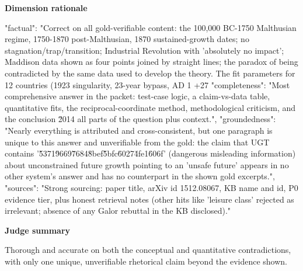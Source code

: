 \documentclass[10pt]{article}
\begin{document}
\textbf{Dimension rationale}
\begin{EvidenceText}
{
  "factual": "Correct on all gold-verifiable content: the 100,000 BC-1750 Malthusian regime, 1750-1870 post-Malthusian, 1870 sustained-growth dates; no stagnation/trap/transition; Industrial Revolution with 'absolutely no impact'; Maddison data shown as four points joined by straight lines; the paradox of being contradicted by the same data used to develop the theory. The fit parameters for 12 countries (1923 singularity, 23-year bypass, AD 1 +27%
  "completeness": "Most comprehensive answer in the packet: test-case logic, a claim-vs-data table, quantitative fits, the reciprocal-coordinate method, methodological criticism, and the conclusion \u2014 all parts of the question plus context.",
  "groundedness": "Nearly everything is attributed and cross-consistent, but one paragraph is unique to this answer and unverifiable from the gold: the claim that UGT contains '\u5371\u9669\u7684\u8bef\u5bfc\u6027\u4fe1\u606f' (dangerous misleading information) about unconstrained future growth pointing to an 'unsafe future' appears in no other system's answer and has no counterpart in the shown gold excerpts.",
  "sources": "Strong sourcing: paper title, arXiv id 1512.08067, KB name and id, P0 evidence tier, plus honest retrieval notes (other hits like 'leisure class' rejected as irrelevant; absence of any Galor rebuttal in the KB disclosed)."
}
\end{EvidenceText}

\textbf{Judge summary}
\begin{EvidenceText}
Thorough and accurate on both the conceptual and quantitative contradictions, with only one unique, unverifiable rhetorical claim beyond the evidence shown.
\end{EvidenceText}
\end{document}

